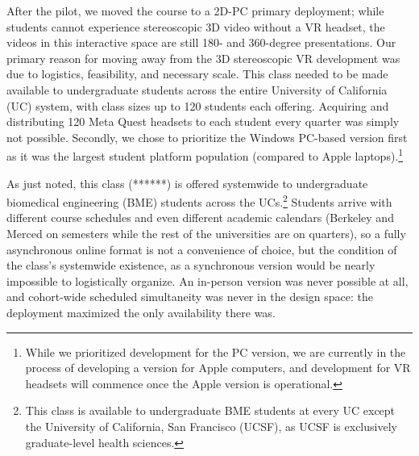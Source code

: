 
After the pilot, we moved the course to a 2D-PC primary
deployment; while students cannot experience stereoscopic 3D video without a VR
headset, the videos in this interactive space are still 180- and 360-degree
presentations. Our primary reason for moving away from the 3D stereoscopic VR
development was due to logistics, feasibility, and necessary scale. This class
needed to be made available to undergraduate students across the entire
University of California (UC) system, with class sizes up to 120 students each
offering. Acquiring and distributing 120 Meta Quest headsets to each student
every quarter was simply not possible. Secondly, we chose to prioritize the
Windows PC-based version first as it was the largest student platform population
(compared to Apple laptops).\footnote{While we prioritized development for the
PC version, we are currently in the process of developing a version for Apple
computers, and development for VR headsets will commence once the Apple version
is operational.}

As just noted, this class (******) is offered systemwide to undergraduate
biomedical engineering (BME) students across the UCs.\footnote{This class is
available to undergraduate BME students at every UC except the University of
California, San Francisco (UCSF), as UCSF is exclusively graduate-level health
sciences.} Students arrive with different course schedules and even different
academic calendars (Berkeley and Merced on semesters while the rest of the
universities are on quarters), so a fully asynchronous online format is not a
convenience of choice, but the condition of the class's systemwide existence, as
a synchronous version would be nearly impossible to logistically organize. An
in-person version was never possible at all, and cohort-wide scheduled
simultaneity was never in the design space: the deployment maximized the only
availability there was.


